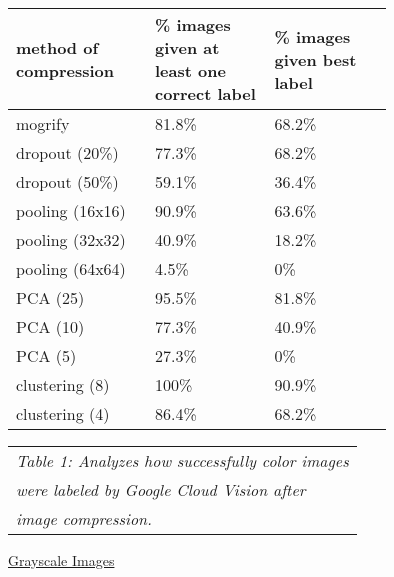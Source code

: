 \documentclass[letterpaper, 10 pt, conference]{ieeeconf}  %
\begin{document}
\bgroup
\def\arraystretch{1.2} %
\begin{tabular}{|p{0.25\linewidth}|p{0.25\linewidth}|p{0.25\linewidth}|}
\hline
{\bf method of compression} & {\bf \% images given at least one correct label} 
	& {\bf \% images given best label} \\
\hline
mogrify & 81.8\% & 68.2\% \\ %
\hline
dropout (20\%) & 77.3\% & 68.2\% \\ %
\hline
dropout (50\%) & 59.1\% & 36.4\% \\ %
\hline
pooling (16x16) & 90.9\% & 63.6\% \\ %
\hline
pooling (32x32) & 40.9\% & 18.2\% \\ %
\hline
pooling (64x64) & 4.5\% & 0\% \\ %
\hline
PCA (25) & 95.5\% & 81.8\% \\ %
\hline
PCA (10) & 77.3\% & 40.9\% \\ %
\hline
PCA (5) & 27.3\% & 0\% \\ %
\hline
clustering (8) & 100\% & 90.9\% \\ %
\hline
clustering (4) & 86.4\% & 68.2\% \\ %
\hline
\end{tabular}
\egroup

\vspace*{2mm}
\begin{tabular}{l}
{\it Table 1: Analyzes how successfully color images} \\
{\it were labeled by Google Cloud Vision after} \\
{\it image compression.} \\
\end{tabular}
\vspace*{4mm}

\vspace*{2mm}

\hspace*{28mm} \underline{Grayscale Images}

\vspace*{2mm}
\end{document}
